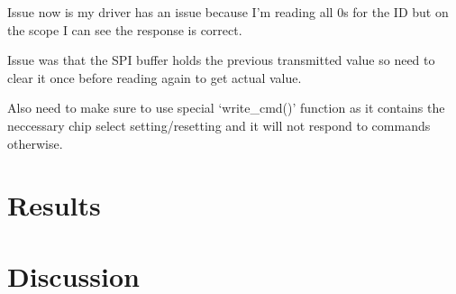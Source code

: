Issue now is my driver has an issue because I'm reading all 0s for the
ID but on the scope I can see the response is correct.

Issue was that the SPI buffer holds the previous transmitted value so need to clear it once
before reading again to get actual value.

Also need to make sure to use special `write\_cmd()' function as it contains the neccessary
chip select setting/resetting and it will not respond to commands otherwise.


\section{Results}

\section{Discussion}
